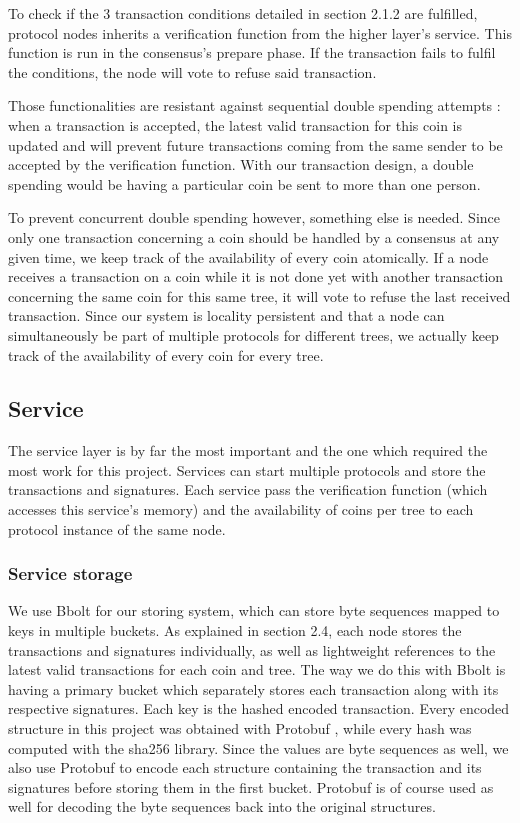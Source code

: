 \documentclass[11pt, a4paper, twoside, openright]{article}
\begin{document}
To check if the 3 transaction conditions detailed in section 2.1.2 are fulfilled, protocol nodes inherits a verification function from the higher layer's service. This function is run in the consensus's prepare phase. If the transaction fails to fulfil the conditions, the node will vote to refuse said transaction.

Those functionalities are resistant against sequential double spending attempts : when a transaction is accepted, the latest valid transaction for this coin is updated and will prevent future transactions coming from the same sender to be accepted by the verification function. With our transaction design, a double spending would be having a particular coin be sent to more than one person.

To prevent concurrent double spending however, something else is needed. Since only one transaction concerning a coin should be handled by a consensus at any given time, we keep track of the availability of every coin atomically. If a node receives a transaction on a coin while it is not done yet with another transaction concerning the same coin for this same tree, it will vote to refuse the last received transaction. Since our system is locality persistent and that a node can simultaneously be part of multiple protocols for different trees, we actually keep track of the availability of every coin for every tree.

\subsection{Service}

The service layer is by far the most important and the one which required the most work for this project. 
Services can start multiple protocols and store the transactions and signatures. Each service pass the verification function (which accesses this service's memory) and the availability of coins per tree to each protocol instance of the same node.

\subsubsection{Service storage}

We use Bbolt \cite{bbolt} for our storing system, which can store byte sequences mapped to keys in multiple buckets. As explained in section 2.4, each node stores the transactions and signatures individually, as well as lightweight references to the latest valid transactions for each coin and tree. The way we do this with Bbolt is having a primary bucket which separately stores each transaction along with its respective signatures. Each key is the hashed encoded transaction. Every encoded structure in this project was obtained with Protobuf \cite{protobuf}, while every hash was computed with the sha256 library. Since the values are byte sequences as well, we also use Protobuf to encode each structure containing the transaction and its signatures before storing them in the first bucket. Protobuf is of course used as well for decoding the byte sequences back into the original structures.
\end{document}
